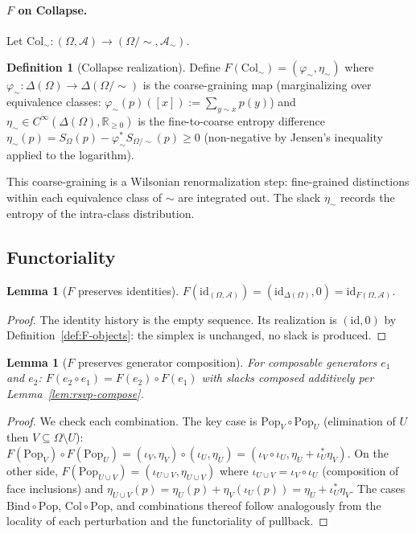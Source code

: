 \documentclass[12pt,a4paper]{article}
\newtheorem{lemma}[theorem]{Lemma}
\theoremstyle{definition}
\newtheorem{definition}[theorem]{Definition}
\theoremstyle{remark}
\newcommand{\Rnn}{\mathbb{R}_{\ge 0}}
\newcommand{\id}{\mathrm{id}}
\newcommand{\Pop}{\mathrm{Pop}}
\newcommand{\Bind}{\mathrm{Bind}}
\newcommand{\Col}{\mathrm{Col}}
\newcommand{\SF}{S}
\begin{document}
\paragraph{$F$ on Collapse.}
Let $\Col_\sim:(\Omega,\mathcal{A})\to(\Omega/{\sim},\mathcal{A}_\sim)$.

\begin{definition}[Collapse realization]
\label{def:F-col}
Define $F(\Col_\sim)=(\varphi_\sim,\eta_\sim)$ where $\varphi_\sim:\Delta(\Omega)
\to\Delta(\Omega/{\sim})$ is the coarse-graining map (marginalizing over equivalence
classes: $\varphi_\sim(p)([x]):=\sum_{y\sim x}p(y)$) and $\eta_\sim\in C^\infty
(\Delta(\Omega),\Rnn)$ is the fine-to-coarse entropy difference $\eta_\sim(p)=
\SF_\Omega(p)-\varphi_\sim^*\SF_{\Omega/\sim}(p)\ge 0$ (non-negative by Jensen's
inequality applied to the logarithm).
\end{definition}

This coarse-graining is a Wilsonian renormalization step: fine-grained distinctions
within each equivalence class of $\sim$ are integrated out. The slack $\eta_\sim$
records the entropy of the intra-class distribution.

\subsection{Functoriality}

\begin{lemma}[$F$ preserves identities]
\label{lem:F-id}
$F(\id_{(\Omega,\mathcal{A})})=(\id_{\Delta(\Omega)},0)=\id_{F(\Omega,\mathcal{A})}$.
\end{lemma}

\begin{proof}
The identity history is the empty sequence. Its realization is $(\id,0)$ by
Definition~\ref{def:F-objects}: the simplex is unchanged, no slack is produced.
\end{proof}

\begin{lemma}[$F$ preserves generator composition]
\label{lem:F-comp}
For composable generators $e_1$ and $e_2$:
$F(e_2\circ e_1)=F(e_2)\circ F(e_1)$ with slacks composed additively per
Lemma~\ref{lem:rsvp-compose}.
\end{lemma}

\begin{proof}
We check each combination. The key case is $\Pop_V\circ\Pop_U$ (elimination of $U$
then $V\subseteq\Omega\setminus U$): $F(\Pop_V)\circ F(\Pop_U)=(\iota_V,\eta_V)\circ
(\iota_U,\eta_U)=(\iota_V\circ\iota_U,\eta_U+\iota_U^*\eta_V)$. On the other side,
$F(\Pop_{U\cup V})=(\iota_{U\cup V},\eta_{U\cup V})$ where $\iota_{U\cup V}=\iota_V
\circ\iota_U$ (composition of face inclusions) and $\eta_{U\cup V}(p)=\eta_U(p)+
\eta_V(\iota_U(p))=\eta_U+\iota_U^*\eta_V$. The cases $\Bind\circ\Pop$, $\Col\circ\Pop$,
and combinations thereof follow analogously from the locality of each perturbation
and the functoriality of pullback.
\end{proof}
\end{document}
